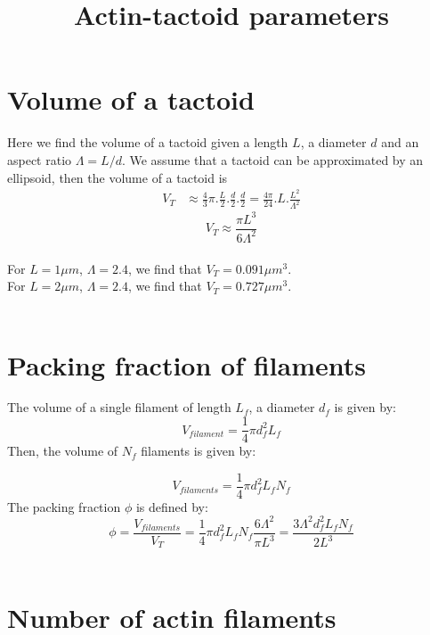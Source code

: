 \documentclass{article}[12pt]
\title{Actin-tactoid parameters}
\begin{document}
\maketitle

\section{Volume of a tactoid}

Here we find the volume of a tactoid given a length $L$, a diameter $d$ and an aspect ratio $\Lambda = L/d$. We assume that a tactoid can be approximated by an ellipsoid, then the volume of a tactoid is
\begin{align*}
V_T &\approx \frac{4}{3}\pi .\frac{L}{2}. \frac{d}{2} .\frac{d}{2} = \frac{4\pi}{24}.L . \frac{L^2}{\Lambda^2}
\end{align*}
\begin{equation}
V_T \approx \frac{\pi L^3}{6 \Lambda^2} \label{eq:vol}
\end{equation}
\\
For $L=1\mu m$, $\Lambda = 2.4$, we find that $V_T = 0.091 \mu m^3$.\\
For $L=2\mu m$, $\Lambda = 2.4$, we find that $V_T = 0.727 \mu m^3$.\\
\\

\section{Packing fraction of filaments}

The volume of a single filament of length $L_f$, a diameter $d_f$ is given by:
\begin{equation*}
V_{filament} = \frac{1}{4}\pi d_f^2 L_f
\end{equation*}
Then, the volume of $N_f$ filaments is given by:

\begin{equation}
V_{filaments} = \frac{1}{4}\pi d_f^2 L_f N_f
\end{equation}
The packing fraction $\phi$ is defined by:
\begin{equation}
\phi = \frac{V_{filaments}}{V_T} =  \frac{1}{4}\pi d_f^2 L_f N_f \frac{6 \Lambda^2}{\pi L^3} = \frac{3 \Lambda^2 d_f^2 L_f N_f}{2L^3}
\end{equation}
\\

\section{Number of actin filaments}
\end{document}

